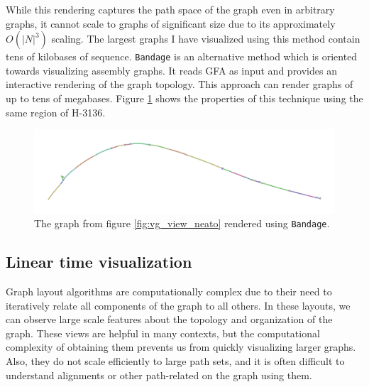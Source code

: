 While this rendering captures the path space of the graph even in arbitrary graphs, it cannot scale to graphs of significant size due to its approximately $O(|N|^3)$ scaling.
The largest graphs I have visualized using this method contain tens of kilobases of sequence.
{\tt Bandage} \cite{wick2015bandage} is an alternative method which is oriented towards visualizing assembly graphs.
It reads GFA as input and provides an interactive rendering of the graph topology.
This approach can render graphs of up to tens of megabases.
Figure \ref{fig:vg_view_bandage} shows the properties of this technique using the same region of H-3136.

\begin{figure}[htbp!] 
\centering    
\includegraphics[width=1.0\textwidth]{Chapter2/Figs/vg_view_H-3136_Bandage.pdf}
\caption[Force-directed layout with Bandage]{The graph from figure \ref{fig:vg_view_neato} rendered using {\tt Bandage}.}
\label{fig:vg_view_bandage}
\end{figure}

\subsection{Linear time visualization}

Graph layout algorithms are computationally complex due to their need to iteratively relate all components of the graph to all others.
In these layouts, we can observe large scale features about the topology and organization of the graph.
These views are helpful in many contexts, but the computational complexity of obtaining them prevents us from quickly visualizing larger graphs.
Also, they do not scale efficiently to large path sets, and it is often difficult to understand alignments or other path-related on the graph using them.

